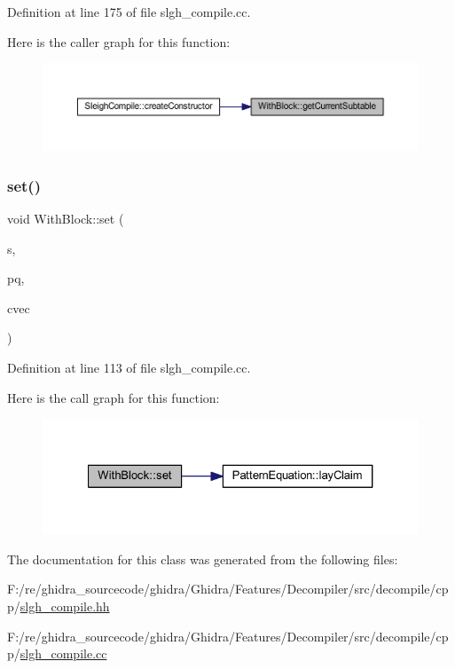 Definition at line 175 of file slgh\+\_\+compile.\+cc.

Here is the caller graph for this function\+:
\nopagebreak
\begin{figure}[H]
\begin{center}
\leavevmode
\includegraphics[width=350pt]{class_with_block_a1b7aa928d0295023c7e8835f4a39ef02_icgraph}
\end{center}
\end{figure}
\mbox{\label{class_with_block_ac1f6e37b3b4a73dec01977574cad4847}} 
\subsubsection{\texorpdfstring{set()}{set()}}
{\footnotesize\ttfamily void With\+Block\+::set (\begin{DoxyParamCaption}\item[{\mbox{\hyperlink{class_subtable_symbol}{Subtable\+Symbol}} $\ast$}]{s,  }\item[{\mbox{\hyperlink{class_pattern_equation}{Pattern\+Equation}} $\ast$}]{pq,  }\item[{vector$<$ \mbox{\hyperlink{class_context_change}{Context\+Change}} $\ast$ $>$ $\ast$}]{cvec }\end{DoxyParamCaption})}



Definition at line 113 of file slgh\+\_\+compile.\+cc.

Here is the call graph for this function\+:
\nopagebreak
\begin{figure}[H]
\begin{center}
\leavevmode
\includegraphics[width=327pt]{class_with_block_ac1f6e37b3b4a73dec01977574cad4847_cgraph}
\end{center}
\end{figure}


The documentation for this class was generated from the following files\+:\begin{DoxyCompactItemize}
\item 
F\+:/re/ghidra\+\_\+sourcecode/ghidra/\+Ghidra/\+Features/\+Decompiler/src/decompile/cpp/\mbox{\hyperlink{slgh__compile_8hh}{slgh\+\_\+compile.\+hh}}\item 
F\+:/re/ghidra\+\_\+sourcecode/ghidra/\+Ghidra/\+Features/\+Decompiler/src/decompile/cpp/\mbox{\hyperlink{slgh__compile_8cc}{slgh\+\_\+compile.\+cc}}\end{DoxyCompactItemize}
